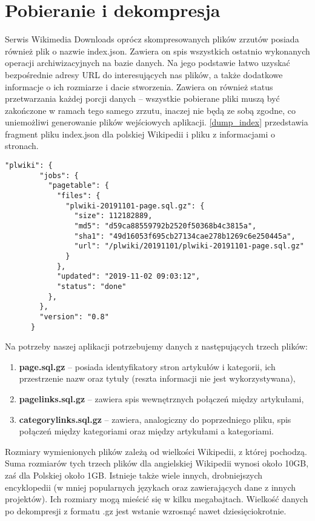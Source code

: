 \section{Pobieranie i dekompresja}
Serwis Wikimedia Downloads oprócz skompresowanych plików zrzutów posiada również plik o nazwie index.json. Zawiera on spis wszystkich ostatnio wykonanych operacji archiwizacyjnych na bazie danych. Na jego podstawie łatwo uzyskać bezpośrednie adresy URL do interesujących nas plików, a także dodatkowe informacje o ich rozmiarze i dacie stworzenia. Zawiera on również status przetwarzania każdej porcji danych – wszystkie pobierane pliki muszą być zakończone w ramach tego samego zrzutu, inaczej nie będą ze sobą zgodne, co uniemożliwi generowanie plików wejściowych aplikacji. \ref{dump_index} przedstawia fragment pliku index.json dla polskiej Wikipedii i pliku z informacjami o stronach.

\begin{lstlisting}[frame=single,caption={Fragment informacji o ostatnim zrzucie bazy danych polskiej Wikipedii},label=dump_index]
    "plwiki": {
        "jobs": {
          "pagetable": {
            "files": {
              "plwiki-20191101-page.sql.gz": {
                "size": 112182889,
                "md5": "d59ca88559792b2520f50368b4c3815a",
                "sha1": "49d16053f695cb27134cae278b1269c6e250445a",
                "url": "/plwiki/20191101/plwiki-20191101-page.sql.gz"
              }
            },
            "updated": "2019-11-02 09:03:12",
            "status": "done"
          },
        },
        "version": "0.8"
      }      
\end{lstlisting}

Na potrzeby naszej aplikacji potrzebujemy danych z następujących trzech plików:

\begin{enumerate}[label=\textbullet]
    \item \textbf{page.sql.gz} – posiada identyfikatory stron artykułów i kategorii, ich przestrzenie nazw oraz tytuły (reszta informacji nie jest wykorzystywana),
    \item \textbf{pagelinks.sql.gz} – zawiera spis wewnętrznych połączeń między artykułami,
    \item \textbf{categorylinks.sql.gz} – zawiera, analogiczny do poprzedniego pliku, spis połączeń między kategoriami oraz między artykułami a kategoriami.
\end{enumerate}

Rozmiary wymienionych plików zależą od wielkości Wikipedii, z której pochodzą. Suma rozmiarów tych trzech plików dla angielskiej Wikipedii wynosi około 10GB, zaś dla Polskiej około 1GB. Istnieje także wiele innych, drobniejszych encyklopedii (w mniej popularnych językach oraz zawierających dane z innych projektów). Ich rozmiary mogą mieścić się w kilku megabajtach. Wielkość danych po dekompresji z formatu .gz jest wstanie wzrosnąć nawet dziesięciokrotnie.